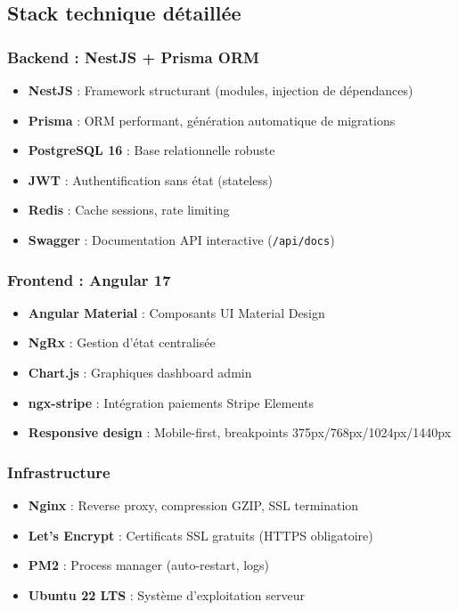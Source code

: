 \documentclass[12pt, a4paper]{article}
\begin{document}
\subsection{Stack technique détaillée}

\subsubsection*{Backend : NestJS + Prisma ORM}
\begin{itemize}[leftmargin=*,noitemsep]
  \item \textbf{NestJS} : Framework structurant (modules, injection de dépendances)
  \item \textbf{Prisma} : ORM performant, génération automatique de migrations
  \item \textbf{PostgreSQL 16} : Base relationnelle robuste
  \item \textbf{JWT} : Authentification sans état (stateless)
  \item \textbf{Redis} : Cache sessions, rate limiting
  \item \textbf{Swagger} : Documentation API interactive (\texttt{/api/docs})
\end{itemize}

\subsubsection*{Frontend : Angular 17}
\begin{itemize}[leftmargin=*,noitemsep]
  \item \textbf{Angular Material} : Composants UI Material Design
  \item \textbf{NgRx} : Gestion d'état centralisée
  \item \textbf{Chart.js} : Graphiques dashboard admin
  \item \textbf{ngx-stripe} : Intégration paiements Stripe Elements
  \item \textbf{Responsive design} : Mobile-first, breakpoints 375px/768px/1024px/1440px
\end{itemize}

\subsubsection*{Infrastructure}
\begin{itemize}[leftmargin=*,noitemsep]
  \item \textbf{Nginx} : Reverse proxy, compression GZIP, SSL termination
  \item \textbf{Let's Encrypt} : Certificats SSL gratuits (HTTPS obligatoire)
  \item \textbf{PM2} : Process manager (auto-restart, logs)
  \item \textbf{Ubuntu 22 LTS} : Système d'exploitation serveur
\end{itemize}
\end{document}
